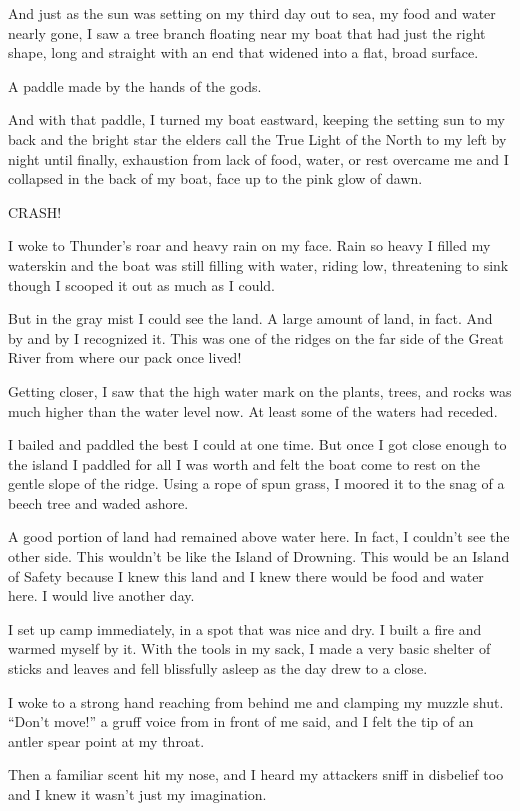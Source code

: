 And just as the sun was setting on my third day out to sea, my food and water nearly gone, I saw a tree branch floating near my boat that had just the right shape, long and straight with an end that widened into a flat, broad surface.

A paddle made by the hands of the gods.

And with that paddle, I turned my boat eastward, keeping the setting sun to my back and the bright star the elders call the True Light of the North to my left by night until finally, exhaustion from lack of food, water, or rest overcame me and I collapsed in the back of my boat, face up to the pink glow of dawn.

CRASH!

I woke to Thunder's roar and heavy rain on my face. Rain so heavy I filled my waterskin and the boat was still filling with water, riding low, threatening to sink though I scooped it out as much as I could.

But in the gray mist I could see the land. A large amount of land, in fact. And by and by I recognized it. This was one of the ridges on the far side of the Great River from where our pack once lived!

Getting closer, I saw that the high water mark on the plants, trees, and rocks was much higher than the water level now. At least some of the waters had receded.

I bailed and paddled the best I could at one time. But once I got close enough to the island I paddled for all I was worth and felt the boat come to rest on the gentle slope of the ridge. Using a rope of spun grass, I moored it to the snag of a beech tree and waded ashore.

A good portion of land had remained above water here. In fact, I couldn't see the other side. This wouldn't be like the Island of Drowning. This would be an Island of Safety because I knew this land and I knew there would be food and water here. I would live another day.

I set up camp immediately, in a spot that was nice and dry. I built a fire and warmed myself by it. With the tools in my sack, I made a very basic shelter of sticks and leaves and fell blissfully asleep as the day drew to a close.

I woke to a strong hand reaching from behind me and clamping my muzzle shut. ``Don't move!'' a gruff voice from in front of me said, and I felt the tip of an antler spear point at my throat.

Then a familiar scent hit my nose, and I heard my attackers sniff in disbelief too and I knew it wasn't just my imagination.

